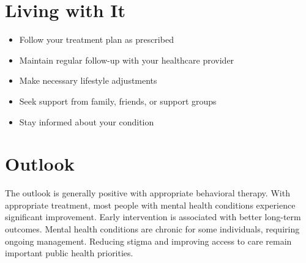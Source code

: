 \section{Living with It}
\begin{itemize}[noitemsep]
  \item Follow your treatment plan as prescribed
  \item Maintain regular follow-up with your healthcare provider
  \item Make necessary lifestyle adjustments
  \item Seek support from family, friends, or support groups
  \item Stay informed about your condition
\end{itemize}
\section{Outlook}
The outlook is generally positive with appropriate behavioral therapy. With appropriate treatment, most people with mental health conditions experience significant improvement. Early intervention is associated with better long-term outcomes. Mental health conditions are chronic for some individuals, requiring ongoing management. Reducing stigma and improving access to care remain important public health priorities.
